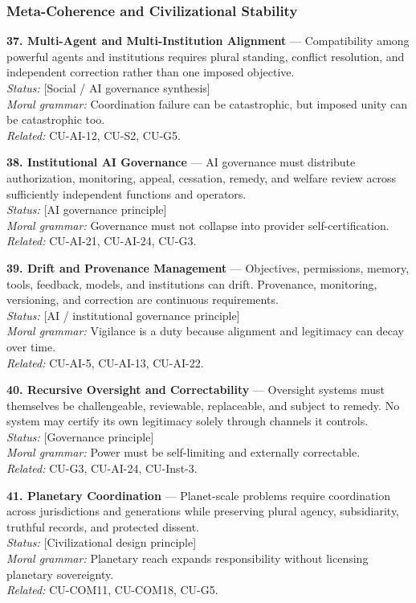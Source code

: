 \documentclass[
  11pt,
]{article}
\begin{document}
\subsubsection{Meta-Coherence and Civilizational
Stability}\label{meta-coherence-and-civilizational-stability}

\textbf{37. Multi-Agent and Multi-Institution Alignment} ---
Compatibility among powerful agents and institutions requires plural
standing, conflict resolution, and independent correction rather than
one imposed objective.\\
\emph{Status:} {[}Social / AI governance synthesis{]}\\
\emph{Moral grammar:} Coordination failure can be catastrophic, but
imposed unity can be catastrophic too.\\
\emph{Related:} CU-AI-12, CU-S2, CU-G5.

\textbf{38. Institutional AI Governance} --- AI governance must
distribute authorization, monitoring, appeal, cessation, remedy, and
welfare review across sufficiently independent functions and
operators.\\
\emph{Status:} {[}AI governance principle{]}\\
\emph{Moral grammar:} Governance must not collapse into provider
self-certification.\\
\emph{Related:} CU-AI-21, CU-AI-24, CU-G3.

\textbf{39. Drift and Provenance Management} --- Objectives,
permissions, memory, tools, feedback, models, and institutions can
drift. Provenance, monitoring, versioning, and correction are continuous
requirements.\\
\emph{Status:} {[}AI / institutional governance principle{]}\\
\emph{Moral grammar:} Vigilance is a duty because alignment and
legitimacy can decay over time.\\
\emph{Related:} CU-AI-5, CU-AI-13, CU-AI-22.

\textbf{40. Recursive Oversight and Correctability} --- Oversight
systems must themselves be challengeable, reviewable, replaceable, and
subject to remedy. No system may certify its own legitimacy solely
through channels it controls.\\
\emph{Status:} {[}Governance principle{]}\\
\emph{Moral grammar:} Power must be self-limiting and externally
correctable.\\
\emph{Related:} CU-G3, CU-AI-24, CU-Inst-3.

\textbf{41. Planetary Coordination} --- Planet-scale problems require
coordination across jurisdictions and generations while preserving
plural agency, subsidiarity, truthful records, and protected dissent.\\
\emph{Status:} {[}Civilizational design principle{]}\\
\emph{Moral grammar:} Planetary reach expands responsibility without
licensing planetary sovereignty.\\
\emph{Related:} CU-COM11, CU-COM18, CU-G5.
\end{document}
